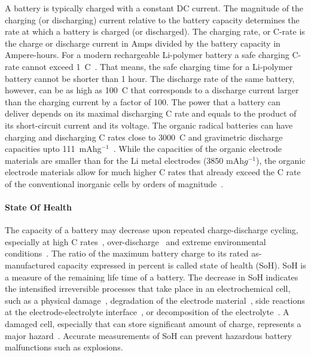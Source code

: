 A battery is typically charged with a constant DC current. The magnitude of the charging (or discharging) current relative to the battery capacity determines the rate at which a battery is charged (or discharged). The charging rate, or C-rate is the charge or discharge current in Amps divided by the battery capacity in Ampere-hours. For a modern rechargeable Li-polymer battery a safe charging C-rate cannot exceed 1~C~\cite{Zhang2022}. That means, the safe charging time for a Li-polymer battery cannot be shorter than 1 hour. The discharge rate of the same battery, however, can be as high as 100~C that corresponds to a discharge current larger than the charging current by a factor of 100. The power that a battery can deliver depends on its maximal discharging C rate and equals to the product of its short-circuit current and its voltage. The organic radical batteries can have charging and discharging C rates close to 3000~C and gravimetric discharge capacities upto 111~mAhg$^{-1}$~\cite{Vereshchagin2020,friebe2017_topcurrchem,Zens2022,Vereshchagin2022,Kulikov2023,Tarascon2001}. While the capacities of the organic electrode materials are smaller than for the Li metal electrodes (3850 mAh$g^{-1}$), the organic electrode materials allow for much higher C rates that already exceed the C rate of the conventional inorganic cells by orders of magnitude~\cite{Diouf2019}.

\paragraph{State Of Health}
The capacity of a battery may decrease upon repeated charge-discharge cycling, especially at high C rates~\cite{Guan2018,Ouyang2020}, over-discharge~\cite{Ma2020} and extreme environmental conditions~\cite{Zhang2022}. The ratio of the maximum battery charge to its rated as-manufactured capacity expressed in percent is called state of health (SoH). SoH is a measure of the remaining life time of a battery. The decrease in SoH indicates the intensified irreversible processes that take place in an electrochemical cell, such as a physical damage~\cite{Fu_2015}, degradation of the electrode material~\cite{Ma2020,Kulikov2022}, side reactions at the electrode-electrolyte interface~\cite{Tarascon2001}, or decomposition of the electrolyte~\cite{Fang_2021}. A damaged cell, especially that can store significant amount of charge, represents a major hazard~\cite{Ma2020}. Accurate measurements of SoH can prevent hazardous battery malfunctions such as explosions.

